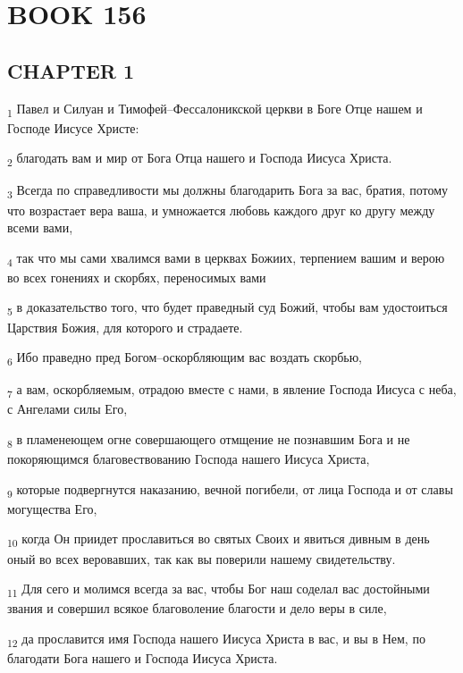 \section{BOOK 156}
\subsection{CHAPTER 1}
\begin{tcolorbox}
\textsubscript{1} Павел и Силуан и Тимофей--Фессалоникской церкви в Боге Отце нашем и Господе Иисусе Христе:
\end{tcolorbox}
\begin{tcolorbox}
\textsubscript{2} благодать вам и мир от Бога Отца нашего и Господа Иисуса Христа.
\end{tcolorbox}
\begin{tcolorbox}
\textsubscript{3} Всегда по справедливости мы должны благодарить Бога за вас, братия, потому что возрастает вера ваша, и умножается любовь каждого друг ко другу между всеми вами,
\end{tcolorbox}
\begin{tcolorbox}
\textsubscript{4} так что мы сами хвалимся вами в церквах Божиих, терпением вашим и верою во всех гонениях и скорбях, переносимых вами
\end{tcolorbox}
\begin{tcolorbox}
\textsubscript{5} в доказательство того, что будет праведный суд Божий, чтобы вам удостоиться Царствия Божия, для которого и страдаете.
\end{tcolorbox}
\begin{tcolorbox}
\textsubscript{6} Ибо праведно пред Богом--оскорбляющим вас воздать скорбью,
\end{tcolorbox}
\begin{tcolorbox}
\textsubscript{7} а вам, оскорбляемым, отрадою вместе с нами, в явление Господа Иисуса с неба, с Ангелами силы Его,
\end{tcolorbox}
\begin{tcolorbox}
\textsubscript{8} в пламенеющем огне совершающего отмщение не познавшим Бога и не покоряющимся благовествованию Господа нашего Иисуса Христа,
\end{tcolorbox}
\begin{tcolorbox}
\textsubscript{9} которые подвергнутся наказанию, вечной погибели, от лица Господа и от славы могущества Его,
\end{tcolorbox}
\begin{tcolorbox}
\textsubscript{10} когда Он приидет прославиться во святых Своих и явиться дивным в день оный во всех веровавших, так как вы поверили нашему свидетельству.
\end{tcolorbox}
\begin{tcolorbox}
\textsubscript{11} Для сего и молимся всегда за вас, чтобы Бог наш соделал вас достойными звания и совершил всякое благоволение благости и дело веры в силе,
\end{tcolorbox}
\begin{tcolorbox}
\textsubscript{12} да прославится имя Господа нашего Иисуса Христа в вас, и вы в Нем, по благодати Бога нашего и Господа Иисуса Христа.
\end{tcolorbox}
